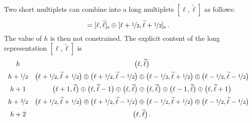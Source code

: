 \documentclass[a4paper, 11pt]{article}
\numberwithin{equation}{section}
\newcommand{\ts}[1]{\widetilde{#1}}
\newcommand{\+}{\oplus}
\begin{document}
Two short multiplets can combine into a long multiplets $[\ell,\ts{\ell}]$ as follows:
\begin{equation}
 	[\ell,\ts{\ell}] = [\ell,\ts{\ell}]_{\rm s} \oplus [\ell+\nicefrac{1}{2},\ts{\ell}+\nicefrac{1}{2}]_{\rm s}\,.
\end{equation}
The value of $h$ is then not constrained. The explicit content of the long representation $[\ell,\ts{\ell}]$  is
\begin{equation}
	\begin{array}{cc}
	 h & \big(\ell,\ts{\ell}\big) \\[5pt]
	 h + \nicefrac{1}{2} & \big(\ell+\nicefrac{1}{2},\ts{\ell}+\nicefrac{1}{2}\big) \oplus\big(\ell+\nicefrac{1}{2},\ts{\ell}-\nicefrac{1}{2}\big) \oplus \big(\ell-\nicefrac{1}{2},\ts{\ell}+\nicefrac{1}{2}\big) \oplus \big(\ell-\nicefrac{1}{2},\ts{\ell}-\nicefrac{1}{2}\big) \\[5pt]
	 h+1 & \big(\ell+1,\ts{\ell}\big) \oplus \big(\ell,\ts{\ell}-1\big) \oplus \big(\ell,\ts{\ell}\big) \oplus \big(\ell,\ts{\ell}\big) \oplus \big(\ell-1,\ts{\ell}\big)\oplus \big(\ell,\ts{\ell}+1\big) \\[5pt]
	 h + \nicefrac{3}{2} & \big(\ell+\nicefrac{1}{2},\ts{\ell}+\nicefrac{1}{2}\big) \oplus\big(\ell+\nicefrac{1}{2},\ts{\ell}-\nicefrac{1}{2}\big) \oplus \big(\ell-\nicefrac{1}{2},\ts{\ell}+\nicefrac{1}{2}\big) \oplus \big(\ell-\nicefrac{1}{2},\ts{\ell}-\nicefrac{1}{2}\big) \\[5pt]
	 h + 2 & \big(\ell,\ts{\ell}\big)\,.
	\end{array}
\end{equation}
	


	
\end{document}
